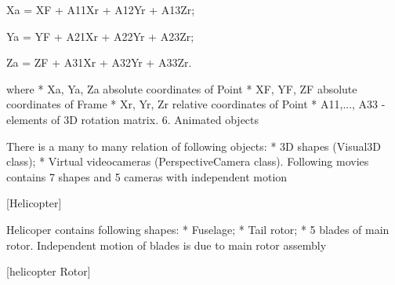 \documentclass[10pt,journal,compsoc]{IEEEtran}
\begin{document}
Xa = XF + A11Xr + A12Yr + A13Zr;

Ya = YF + A21Xr + A22Yr + A23Zr;

Za = ZF + A31Xr + A32Yr + A33Zr.

where 
* Xa, Ya, Za absolute coordinates of Point  
* XF, YF, ZF absolute coordinates of Frame  
* Xr, Yr, Zr relative coordinates of Point  
* A11,..., A33 - elements of {3D rotation matrix}. 
6. Animated objects

There is a many to many relation of following objects:
* 3D shapes ({Visual3D class}); 
* Virtual videocameras ({PerspectiveCamera class}). 
Following movies contains 7 shapes and 5 cameras with independent motion

{[Helicopter]}

Helicoper contains following shapes:
* Fuselage; 
* Tail rotor; 
* 5 blades of main rotor. 
Independent motion of blades is due to {main rotor assembly}

[helicopter Rotor]
\end{document}
